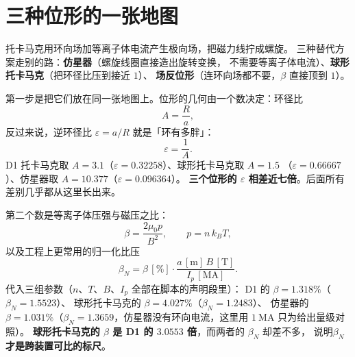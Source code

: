 
\section{三种位形的一张地图}
\label{sec:app-aa-map}

托卡马克用环向场加等离子体电流产生极向场，把磁力线拧成螺旋。
三种替代方案走别的路：\textbf{仿星器}（螺旋线圈直接造出旋转变换，
不需要等离子体电流）、\textbf{球形托卡马克}（把环径比压到接近 $1$）、
\textbf{场反位形}（连环向场都不要，$\beta$ 直接顶到 $1$）。

第一步是把它们放在同一张地图上。位形的几何由一个数决定：环径比
\begin{equation}
A = \frac{R}{a},
\label{eq:app-aa-eps}
\end{equation}
反过来说，逆环径比 $\varepsilon = a/R$ 就是「环有多胖」：
\begin{equation}
\varepsilon = \frac{1}{A}.
\label{eq:app-aa-epsnum}
\end{equation}
D1 托卡马克取 $A=3.1$（$\varepsilon = 0.32258$）、球形托卡马克取 $A=1.5$
（$\varepsilon = 0.66667$）、仿星器取 $A=10.377$（$\varepsilon = 0.096364$）。
\textbf{三个位形的 $\varepsilon$ 相差近七倍}。后面所有差别几乎都从这里长出来。

第二个数是等离子体压强与磁压之比：
\begin{equation}
\beta = \frac{2\mu_0 p}{B^2},\qquad p = n\,k_BT,
\label{eq:app-aa-beta}
\end{equation}
以及工程上更常用的归一化比压
\begin{equation}
\beta_N = \beta\,[\%]\cdot\frac{a\,[\mathrm{m}]\,B\,[\mathrm{T}]}{I_p\,[\mathrm{MA}]}.
\label{eq:app-aa-betan}
\end{equation}
代入三组参数（$n$、$T$、$B$、$I_p$ 全部在脚本的声明段里）：
D1 的 $\beta = 1.318\%$（$\beta_N = 1.5523$）、
球形托卡马克的 $\beta = 4.027\%$（$\beta_N = 1.2483$）、
仿星器的 $\beta = 1.031\%$（$\beta_N = 1.3659$，仿星器没有环向电流，这里用 $1\ \mathrm{MA}$ 只为给出量级对照）。
\textbf{球形托卡马克的 $\beta$ 是 D1 的 $3.0553$ 倍}，而两者的 $\beta_N$ 却差不多，
说明\textbf{$\beta_N$ 才是跨装置可比的标尺}。

